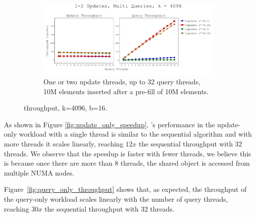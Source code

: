 \begin{figure}[h]
    \begin{subfigure}[]{\textwidth}
        \centering
        \includegraphics[width=\textwidth,trim={0cm 0cm 0cm 1cm},clip]
        {graphics/graphs/throughput/oracle_Quancurrent_blocking_numa_update_query_k_4096_b16_keys10M_pre10M_preT1_runs15_Tu1-2_Tq2-30_snapshot1_rho_1_0-05_united_16-08-2022_07-09-08.pdf}
        \caption{One or two update threads, up to 32 query threads, 10M elements inserted after a pre-fill of 10M elements.}
        \label{fig:mixed_throughput}
    \end{subfigure}
    \caption{\mysketch throughput, k=4096, b=16.}
    \label{fig:throughput}
\end{figure}


As shown in Figure \ref{fig:update_only_speedup}, \mysketch's performance in the update-only workload with a single thread is similar to the sequential algorithm and with more threads it scales linearly, reaching $12x$ the sequential throughput with 32 threads. 
We observe that the speedup is faster with fewer threads, we believe this is because once there are more than $8$ threads, the shared object is accessed from multiple NUMA nodes.


Figure~\ref{fig:query_only_throughput} shows that, as expected, the throughput of the query-only workload scales linearly with the number of query threads, reaching $30x$ the sequential throughput with 32 threads.


